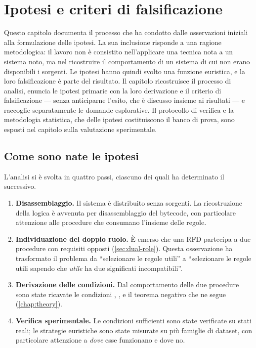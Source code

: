 \chapter{Ipotesi e criteri di falsificazione}\label{chap:hypotheses}


\noindent Questo capitolo documenta il processo che ha condotto dalle osservazioni iniziali alla
formulazione delle ipotesi. La sua inclusione risponde a una ragione metodologica: il lavoro non è
consistito nell'applicare una tecnica nota a un sistema noto, ma nel ricostruire il comportamento
di un sistema di cui non erano disponibili i sorgenti. Le ipotesi hanno quindi svolto una funzione
euristica, e la loro falsificazione è parte del risultato. Il capitolo ricostruisce il processo di
analisi, enuncia le ipotesi primarie con la loro derivazione e il criterio di falsificazione ---
senza anticiparne l'esito, che è discusso insieme ai risultati --- e raccoglie separatamente le
domande esplorative. Il protocollo di verifica e la metodologia statistica, che delle ipotesi
costituiscono il banco di prova, sono esposti nel capitolo sulla valutazione sperimentale.

\section{Come sono nate le ipotesi}\label{sec:analysis-process}

L'analisi si è svolta in quattro passi, ciascuno dei quali ha determinato il successivo.

\begin{enumerate}[leftmargin=1.6em]
    \item \textbf{Disassemblaggio.} Il sistema è distribuito senza sorgenti. La ricostruzione
    della logica è avvenuta per disassemblaggio del bytecode, con particolare attenzione alle
    procedure che consumano l'insieme delle regole.
    \item \textbf{Individuazione del doppio ruolo.} È emerso che una RFD partecipa a due
    procedure con requisiti opposti (\autoref{sec:dual-role}). Questa osservazione ha trasformato
    il problema da ``selezionare le regole utili'' a ``selezionare le regole utili sapendo che
    \emph{utile} ha due significati incompatibili''.
    \item \textbf{Derivazione delle condizioni.} Dal comportamento delle due procedure sono state
    ricavate le condizioni \Vone{}, \Vtwo{}, \Vthree{} e il teorema negativo che ne segue
    (\autoref{chap:theory}).
    \item \textbf{Verifica sperimentale.} Le condizioni sufficienti sono state verificate su
    stati reali; le strategie euristiche sono state misurate su più famiglie di dataset, con
    particolare attenzione a \emph{dove} esse funzionano e dove no.
\end{enumerate}

